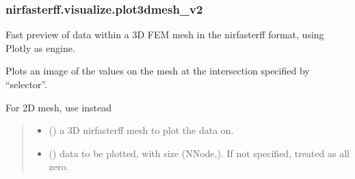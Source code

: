\documentclass[letterpaper,10pt,english]{sphinxmanual}
\begin{document}
\sphinxstepscope


\subsubsection{nirfasterff.visualize.plot3dmesh\_v2}
\label{\detokenize{_autosummary/nirfasterff.visualize.plot3dmesh_v2:nirfasterff-visualize-plot3dmesh-v2}}\label{\detokenize{_autosummary/nirfasterff.visualize.plot3dmesh_v2::doc}}

\begin{fulllineitems}
\label{\detokenize{_autosummary/nirfasterff.visualize.plot3dmesh_v2:nirfasterff.visualize.plot3dmesh_v2}}
\pysigstartsignatures
\pysiglinewithargsret
{}
{\sphinxparamcomma {}\sphinxparamcomma {}\sphinxparamcomma {}\sphinxparamcomma {}\sphinxparamcomma {}}
{}
\pysigstopsignatures
\sphinxAtStartPar
Fast preview of data within a 3D FEM mesh in the nirfasterff format, using Plotly as engine.

\sphinxAtStartPar
Plots an image of the values on the mesh at the intersection specified by “selector”.

\sphinxAtStartPar
For 2D mesh, use {\hyperref[\detokenize{_autosummary/nirfasterff.visualize.plotimage:nirfasterff.visualize.plotimage}]{}} instead
\begin{quote}\begin{description}
\begin{itemize}
\item {} 
\sphinxAtStartPar
{} () \textendash{} a 3D nirfasterff mesh to plot the data on.

\item {} 
\sphinxAtStartPar
{} (\sphinxstyleliteralemphasis{\sphinxupquote{, }}) \textendash{} data to be plotted, with size (NNode,). If not specified, treated as all zero.


\end{itemize}
\end{description}
\end{quote}
\end{fulllineitems}
\end{document}
